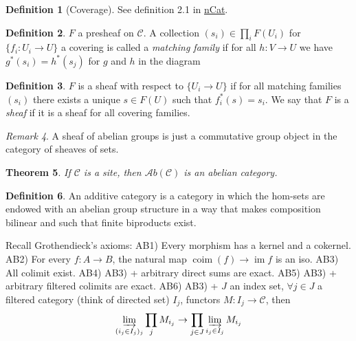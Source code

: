 \documentclass[11pt,A4]{article}
\theoremstyle{plain}
\newtheorem{thm}{Theorem}[section]
\theoremstyle{definition}
\newtheorem{defn}[thm]{Definition}
\theoremstyle{remark}
\newtheorem{rem}[thm]{Remark}
\newcommand{\1}{\mathbbm{1}}
\newcommand{\scrC}{\mathscr{C}}
\newcommand{\Ab}{\mathscr{A}b}
\DeclareMathOperator{\im}{im}
\begin{document}
\begin{defn}[Coverage]
    See definition 2.1 in \href{https://ncatlab.org/nlab/show/coverage}{nCat}.
\end{defn}

\begin{defn}
    $F$ a presheaf on $\scrC$.
    A collection $(s_{i})\in \prod_{i}F(U_{i})$ for $\{f_{i}\colon U_{i}\to U\}$ a covering is called a \textit{matching family} if for all $h\colon V\to U$ we have $g^{*}(s_{i})=h^{*}(s_{j})$ for $g$ and $h$ in the diagram
    \begin{center}
    \end{center}
\end{defn}

\begin{defn}
    $F$ is a sheaf with respect to $\{U_{i}\to U\}$ if for all matching families $(s_{i})$ there exists a unique $s\in F(U)$ such that $f_{i}^{*}(s)=s_{i}$.
    We say that $F$ is a \textit{sheaf} if it is a sheaf for all covering families.
\end{defn}

\begin{rem}
    A sheaf of abelian groups is just a commutative group object in the category of sheaves of sets.
\end{rem}

\begin{thm}
    If $\scrC$ is a site, then $\Ab(\scrC)$ is an abelian category.
\end{thm}

\begin{defn}
    An additive category is a category in which the hom-sets are endowed with an abelian group structure in a way that makes composition bilinear and such that finite biproducts exist.
\end{defn}

Recall Grothendieck's axioms:
AB1) Every morphism has a kernel and a cokernel.
AB2) For every $f\colon A\to B$, the natural map $\operatorname{coim}(f)\to \im{f}$ is an iso.
AB3) All colimit exist.
AB4) AB3) + arbitrary direct sums are exact.
AB5) AB3) + arbitrary filtered colimits are exact.
AB6) AB3) + $J$ an index set, $\forall j\in J$ a filtered category (think of directed set) $I_{j}$, functors $M\colon I_{j}\to \scrC$, then
\[\varinjlim_{(i_{j}\in I_{j})_{j}}\prod_{j} M_{i_{j}}\to \prod_{j\in J}\varinjlim_{i_{j}\in I_{j}} M_{i_{j}} \]
\end{document}

